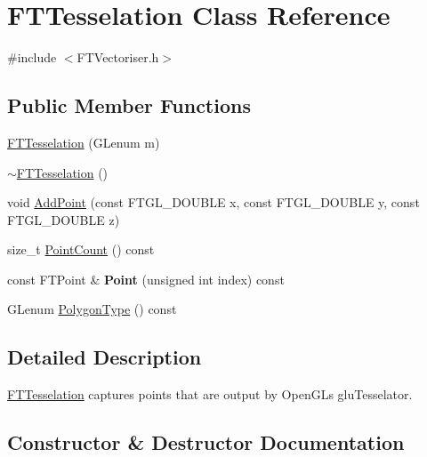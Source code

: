 \hypertarget{class_f_t_tesselation}{}\section{F\+T\+Tesselation Class Reference}
\label{class_f_t_tesselation}


{\ttfamily \#include $<$F\+T\+Vectoriser.\+h$>$}

\subsection*{Public Member Functions}
\begin{DoxyCompactItemize}
\item 
\hyperlink{class_f_t_tesselation_a8ae81852ffa0dfb1bc65e85dc6d35df2}{F\+T\+Tesselation} (G\+Lenum m)
\item 
\hyperlink{class_f_t_tesselation_a55bd008edbf969720fa3dc083bce1ac0}{$\sim$\+F\+T\+Tesselation} ()
\item 
void \hyperlink{class_f_t_tesselation_a204a9e646cee25f374faad125d71d5e6}{Add\+Point} (const F\+T\+G\+L\+\_\+\+D\+O\+U\+B\+LE x, const F\+T\+G\+L\+\_\+\+D\+O\+U\+B\+LE y, const F\+T\+G\+L\+\_\+\+D\+O\+U\+B\+LE z)
\item 
size\+\_\+t \hyperlink{class_f_t_tesselation_aa3cb26a53c3534576339f946acdc0cc7}{Point\+Count} () const 
\item 
const F\+T\+Point \& {\bfseries Point} (unsigned int index) const \hypertarget{class_f_t_tesselation_a964ae8f16f216ca545f44a087f31e827}{}\label{class_f_t_tesselation_a964ae8f16f216ca545f44a087f31e827}

\item 
G\+Lenum \hyperlink{class_f_t_tesselation_a06c290061a75bad0d38a2d5b2f6b09a1}{Polygon\+Type} () const 
\end{DoxyCompactItemize}


\subsection{Detailed Description}
\hyperlink{class_f_t_tesselation}{F\+T\+Tesselation} captures points that are output by Open\+GL\textquotesingle{}s glu\+Tesselator. 

\subsection{Constructor \& Destructor Documentation}
